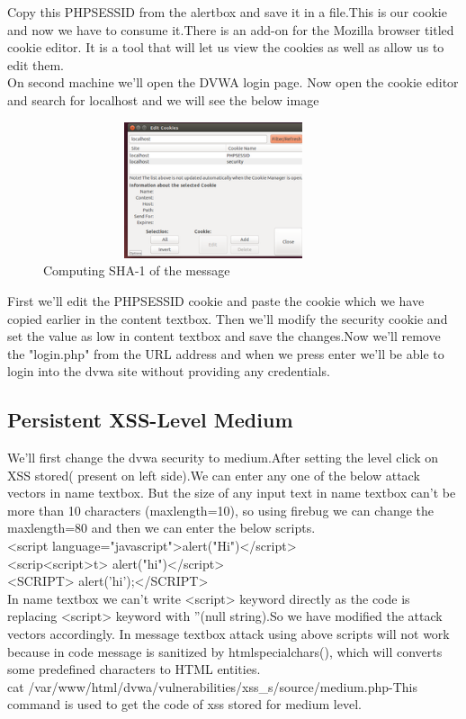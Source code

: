 \documentclass{article}
\begin{document}
Copy this PHPSESSID from the alertbox and save it in a file.This is our cookie and now we have to consume it.There is an add-on for the Mozilla browser titled cookie editor. It is a tool that will let us view the cookies as well as allow us to  edit them.\\
On second machine we'll open the DVWA login page. Now open the cookie editor and search for localhost and we will see the below image
\begin{figure}[htb]
		\includegraphics[width=10cm,height=4cm]{cookieeditor.png}
		\caption{Computing SHA-1 of the message}
	\end{figure}
First we'll edit the PHPSESSID cookie and paste the cookie which we have copied earlier in the content textbox. Then we'll modify the security cookie and set the value as low in content textbox and save the changes.Now we'll remove the "login.php" from the URL address and when we press enter we'll be able to login into the dvwa site without providing any credentials.
\subsection{Persistent XSS-Level Medium}
We'll first change the dvwa security to medium.After setting the level click on XSS stored( present on left side).We can enter any one of the  below attack vectors in name textbox. But the size of any input text in name textbox can't be more than 10 characters (maxlength=10), so using firebug we can change the maxlength=80 and then we can enter the below scripts.\\
<script language="javascript">alert("Hi")</script>\\
<scrip<script>t> alert("hi")</script>\\
<SCRIPT> alert('hi');</SCRIPT>\\
In name textbox we can't write <script> keyword directly as the code is replacing <script> keyword with ''(null string).So we have modified the attack vectors accordingly.
In message textbox attack using above scripts will not work because in code message is sanitized by htmlspecialchars(), which will converts some predefined characters to HTML entities.\\
cat /var/www/html/dvwa/vulnerabilities/xss\_s/source/medium.php-This command is used to get the code of xss stored for medium level.\\
\end{document}
